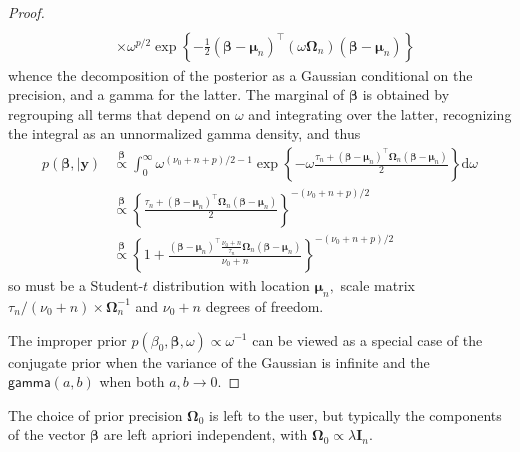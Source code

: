 \documentclass[
  11pt,
  letterpaper,
]{scrbook}
\theoremstyle{definition}
\theoremstyle{plain}
\theoremstyle{plain}
\theoremstyle{plain}
\theoremstyle{definition}
\theoremstyle{definition}
\theoremstyle{plain}
\theoremstyle{plain}
\theoremstyle{remark}
\begin{document}
\begin{proof}
\begin{align*}
   \\& \times \omega^{p/2}\exp\left\{-\frac{1}{2}(\boldsymbol{\beta} - \boldsymbol{\mu}_n)^\top(\omega\mathbf{\Omega}_n)(\boldsymbol{\beta} - \boldsymbol{\mu}_n)\right\}
\end{align*} whence the decomposition of the posterior as a Gaussian
conditional on the precision, and a gamma for the latter. The marginal
of \(\boldsymbol{\beta}\) is obtained by regrouping all terms that
depend on \(\omega\) and integrating over the latter, recognizing the
integral as an unnormalized gamma density, and thus \begin{align*}
 p(\boldsymbol{\beta}, \mid \boldsymbol{y}) & \stackrel{\boldsymbol{\beta}}{\propto} \int_0^\infty \omega^{(\nu_0 + n + p)/2 -1}\exp\left\{- \omega \frac{\tau_n +(\boldsymbol{\beta} - \boldsymbol{\mu}_n)^\top\mathbf{\Omega}_n(\boldsymbol{\beta} - \boldsymbol{\mu}_n)}{2}\right\} \mathrm{d} \omega
 \\&\stackrel{\boldsymbol{\beta}}{\propto} \left\{\frac{\tau_n +(\boldsymbol{\beta} - \boldsymbol{\mu}_n)^\top\mathbf{\Omega}_n(\boldsymbol{\beta} - \boldsymbol{\mu}_n)}{2}\right\}^{-(\nu_0 + n + p)/2}
 \\& \stackrel{\boldsymbol{\beta}}{\propto} \left\{1 + \frac{(\boldsymbol{\beta} - \boldsymbol{\mu}_n)^\top\frac{\nu_0 + n}{\tau_n}\mathbf{\Omega}_n(\boldsymbol{\beta} - \boldsymbol{\mu}_n)}{\nu_0 + n}\right\}^{-(\nu_0 + n + p)/2}
\end{align*} so must be a Student-\(t\) distribution with location
\(\boldsymbol{\mu}_n,\) scale matrix
\(\tau_n/(\nu_0+n) \times \mathbf{\Omega}_n^{-1}\) and \(\nu_0+n\)
degrees of freedom.

The improper prior
\(p(\beta_0, \boldsymbol{\beta}, \omega) \propto \omega^{-1}\) can be
viewed as a special case of the conjugate prior when the variance of the
Gaussian is infinite and the \(\mathsf{gamma}(a,b)\) when both
\(a, b \to 0.\)
\end{proof}

The choice of prior precision \(\boldsymbol{\Omega}_0\) is left to the
user, but typically the components of the vector \(\boldsymbol{\beta}\)
are left apriori independent, with
\(\boldsymbol{\Omega}_0 \propto \lambda\mathbf{I}_n.\)
\end{document}
